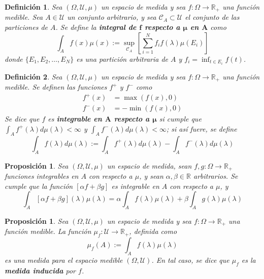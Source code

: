 \documentclass[12pt,letterpaper]{book}
\newtheorem{definicion}{Definición}[chapter]
\newtheorem{proposicion}[teorema]{Proposición}
\newcommand{\R}{\mathbb{R}}
\begin{document}
\begin{definicion}
Sea $(\Omega, \mathcal{U}, \mu)$ un espacio de medida y sea $f:\Omega \rightarrow \R_+$ una función medible. Sea $A\in \mathcal{U}$ un conjunto arbitrario, y sea $\mathcal{C}_A \subset \mathcal{U}$ el conjunto de las particiones de $A$.
Se define la \textbf{integral de $\boldsymbol{f}$ respecto a $\boldsymbol{\mu}$ en $\boldsymbol{A}$} como
\begin{equation}
\int_A f(x) \mu(x) := \sup_{\mathcal{C}_A} \left[ \sum_{i=1}^{N} f_i f(\lambda) \mu(E_i) \right]
\end{equation}
donde $\{ E_1, E_2, \dots, E_N \}$ es una partición arbitraria de $A$ y $f_i = \inf_{t \in E_i} f(t)$.
\label{def:lazy1}
\end{definicion}

\begin{definicion}
Sea $(\Omega, \mathcal{U}, \mu)$ un espacio de medida y sea $f:\Omega \rightarrow \R_+$ una función medible. Se definen las funciones $f^{+}$ y $f^{-}$ como
\begin{align*}
f^{+}(x) &= \max (f(x), 0 ) \\
f^{-}(x) &= -\min (f(x), 0 )
\end{align*}
Se dice que $f$ es \textbf{integrable en $\boldsymbol{A}$ respecto a $\boldsymbol{\mu}$} si cumple que $\int_A f^{+}(\lambda) d\mu(\lambda) < \infty$ y $\int_A f^{-}(\lambda) d\mu(\lambda) < \infty$; si así fuere, se define
\begin{equation}
\int_A f(\lambda) d\mu(\lambda) := \int_A f^{+}(\lambda) d\mu(\lambda) - \int_A f^{-}(\lambda) d\mu(\lambda)
\end{equation}
\label{def:lazy2}
\end{definicion}

\begin{proposicion}
Sea $(\Omega, \mathcal{U}, \mu)$ un espacio de medida, sean $f,g:\Omega \rightarrow \R_+$ funciones integrables en $A$ con respecto a $\mu$, y sean $\alpha, \beta \in \R$ arbitrarios. 
%
Se cumple que la función $[\alpha f + \beta g]$ es integrable en $A$ con respecto a $\mu$, y
\begin{equation}
\int_A \left[ \alpha f + \beta g \right] (\lambda) \mu(\lambda) = \alpha \int_A f(\lambda) \mu(\lambda) + \beta \int_A g(\lambda) \mu(\lambda)
\end{equation}
\end{proposicion}

\begin{proposicion}
Sea $(\Omega, \mathcal{U}, \mu)$ un espacio de medida y sea $f:\Omega \rightarrow \R_+$ una función medible. La función $\mu_f:\mathcal{U}\rightarrow\R_+$, definida como
\begin{equation}
\mu_f(A) := \int_A f(\lambda) \mu(\lambda)
\end{equation}
es una medida para el espacio medible $(\Omega, \mathcal{U})$. En tal caso, se dice que $\mu_f$ es la \textbf{medida inducida} por $f$.
\end{proposicion}
\end{document}
